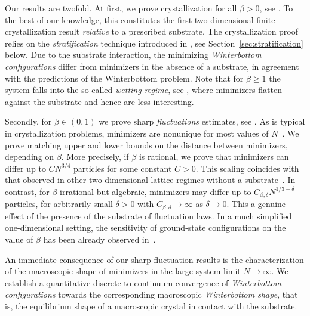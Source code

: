 \documentclass[reqno]{amsart}
\theoremstyle{plain}
\theoremstyle{definition}
\numberwithin{equation}{section}
\begin{document}
Our results are twofold. At first, we prove crystallization for all
$\beta>0$, see . To the best of our
knowledge, this constitutes the first two-dimensional
finite-crystallization result {\it relative} to a prescribed
substrate. %
The crystallization
  proof relies on the {\it stratification} technique introduced in
\cite{FriedrichKreutz}, see Section~\ref{sec:stratification}
below. Due to the substrate
interaction, the minimizing {\it Winterbottom configurations} differ from minimizers 
in the absence of a substrate, in agreement with the predictions of
the Winterbottom problem. Note that for $\beta\geq 1$ the system falls into the so-called
{\it wetting regime}, see , where minimizers flatten against the substrate
and hence are  less interesting. 

Secondly, for $\beta\in(0,1)$ we prove sharp {\it fluctuations}
estimates, see . As is typical in
crystallization problems, minimizers are nonunique for most
values of $N$~\cite{DeLuca4,Mainini-Piovano,  Schmidt-disk}.  We prove matching upper and lower bounds on the distance between
minimizers, depending on $\beta$. More precisely,
if $\beta$ is rational, we prove that minimizers can differ up to 
$  C N^{3/4}$ particles for some constant $C>0$. This
scaling coincides with that observed in other two-dimensional lattice regimes without
a substrate~\cite{Davoli15,Davoli16,Mainini-Piovano,Schmidt-disk}. In contrast, for
$\beta$ irrational but algebraic, minimizers may differ up to  $ C_{\beta, \delta} N^{1/3+ \delta }$ particles, for arbitrarily small $ \delta >0$  with $C_{\beta,\delta }\to \infty$ as ${ \delta} \to 0$.   This a
genuine effect of the presence of
the substrate of fluctuation laws. In a much simplified
one-dimensional setting, the sensitivity of ground-state configurations on the value of $\beta$ has been already observed in~\cite{FriedrichStefanelli}.

An immediate
consequence of our  sharp  fluctuation results is the characterization of the
macroscopic shape of minimizers in the large-system limit $N \to
\infty$. We establish a quantitative
discrete-to-continuum convergence of {\it Winterbottom configurations}  towards the
corresponding macroscopic {\it Winterbottom shape}, that is, the
equilibrium shape of a macroscopic crystal in contact with the
substrate.
\end{document}
